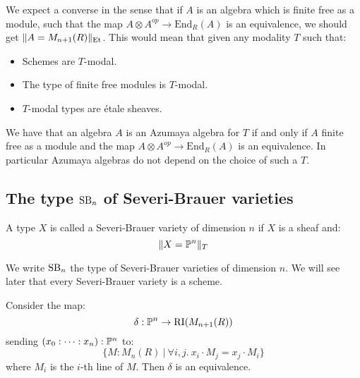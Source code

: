 \begin{remark}\label{azumaya-independent-modality}
We expect a converse in the sense that if $A$ is an algebra which is finite free as a module, such that the map $A\otimes A^{op} \to \mathrm{End}_R(A)$ is an equivalence, we should get $\lVert A=M_{n+1}(R) \rVert_{\mathrm{Et}}$. This would mean that given any modality $T$ such that:
\begin{itemize}
\item Schemes are $T$-modal.
\item The type of finite free modules is $T$-modal.
\item $T$-modal types are étale sheaves.
\end{itemize}
We have that an algebra $A$ is an Azumaya algebra for $T$ if and only if $A$ finite free as a module and the map $A\otimes A^{op} \to \mathrm{End}_R(A)$ is an equivalence. In particular Azumaya algebras do not depend on the choice of such a $T$.
\end{remark}


\subsection{The type $\mathrm{SB}_n$ of Severi-Brauer varieties}

\begin{definition}
A type $X$ is called a Severi-Brauer variety of dimension $n$ if $X$ is a sheaf and:
\[\lVert X=\mathbb{P}^n \rVert_T\]
\end{definition}

We write $\mathrm{SB}_n$ the type of Severi-Brauer varieties of dimension $n$. We will see later that every Severi-Brauer variety is a scheme.

\begin{lemma}\label{right-ideal-of-matrices-are-projective}
Consider the map:
\[\delta:\mathbb{P}^n \to \mathrm{RI}(M_{n+1}(R))\]
sending $(x_0:\cdots:x_n):\mathbb{P}^n$ to:
\[\{M:M_n(R)\ |\ \forall i,j.\ x_i\cdot M_j = x_j\cdot M_i\}\]
where $M_i$ is the $i$-th line of $M$. Then $\delta$ is an equivalence.
\end{lemma}


